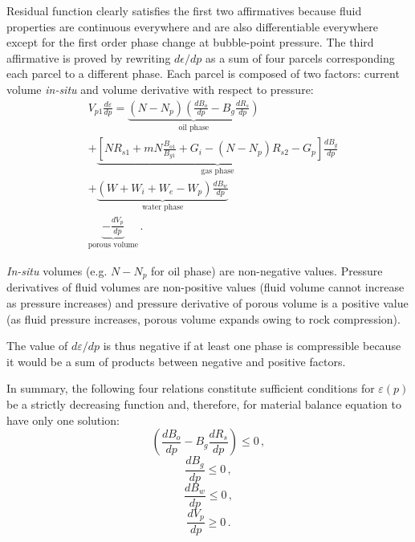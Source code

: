 \documentclass[final,authoryear,5p,times,twocolumn,10pt]{elsarticle}
\begin{document}
Residual function clearly satisfies the first two affirmatives because fluid properties are continuous everywhere and are also differentiable everywhere except for the first order phase change at bubble-point pressure.
The third affirmative is proved by rewriting $d\epsilon/dp$ as a sum of four parcels corresponding each parcel to a different phase. Each parcel is composed of two factors: current volume \textit{in-situ} and volume derivative with respect to pressure:
\begin{equation}
\begin{split}
&V_{p1}\frac{d\varepsilon}{dp}=\underbrace{\left(N-N_p\right) \left(\frac{dB_o}{dp} - B_g \frac{dR_s}{dp} \right)}_\text{oil phase}\\
&+\underbrace{\left[N R_{s1}+mN\frac{B_{o1}}{B_{g1}}+G_i-\left(N-N_p\right)R_{s2}-G_p\right] \frac{dB_g}{dp}}_\text{gas phase}\\
&+\underbrace{\left(W + W_i+W_e-W_p\right)\frac{dB_w}{dp}}_\text{water phase}\\
&\underbrace{-\frac{dV_p}{dp}}_\text{porous volume}\, .
\end{split}
\end{equation}

\textit{In-situ} volumes (e.g. $N-N_p$ for oil phase) are non-negative values. Pressure derivatives of fluid volumes are non-positive values (fluid volume cannot increase as pressure increases) and pressure derivative of porous volume is a positive value (as fluid pressure increases, porous volume expands owing to rock compression).

The value of $d\varepsilon/dp$ is thus negative if at least one phase is compressible because it would be a sum of products between negative and positive factors.

In summary, the following four relations constitute sufficient conditions for $\varepsilon(p)$ be a strictly decreasing function and, therefore, for material balance equation to have only one solution:
\begin{equation}\label{eq: PVTH1}
\left(\frac{dB_o}{dp} - B_g \frac{dR_s}{dp} \right) \leq 0 \, ,
\end{equation}
\begin{equation}\label{eq: PVTH2}
\frac{dB_g}{dp} \leq 0 \, ,
\end{equation}
\begin{equation}\label{eq: PVTH3}
\frac{dB_w}{dp} \leq 0 \, ,
\end{equation}
\begin{equation}\label{eq: PVTH4}
\frac{dV_p}{dp} \geq 0 \, .
\end{equation}
\end{document}
